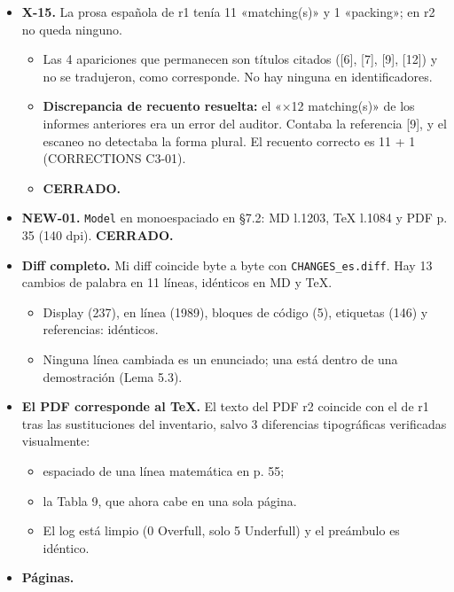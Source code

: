\documentclass[
]{article}
\providecommand{\tightlist}{%
  \setlength{\itemsep}{0pt}\setlength{\parskip}{0pt}}
\begin{document}
\begin{itemize}
\tightlist
\item
  \textbf{X-15.} La prosa española de r1 tenía 11 «matching(s)» y 1
  «packing»; en r2 no queda ninguno.

  \begin{itemize}
  \tightlist
  \item
    Las 4 apariciones que permanecen son títulos citados ({[}6{]},
    {[}7{]}, {[}9{]}, {[}12{]}) y no se tradujeron, como corresponde. No
    hay ninguna en identificadores.
  \item
    \textbf{Discrepancia de recuento resuelta:} el «×12 matching(s)» de
    los informes anteriores era un error del auditor. Contaba la
    referencia {[}9{]}, y el escaneo no detectaba la forma plural. El
    recuento correcto es 11 + 1 (CORRECTIONS C3-01).
  \item
    \textbf{CERRADO.}
  \end{itemize}
\item
  \textbf{NEW-01.} \texttt{Model} en monoespaciado en §7.2: MD l.1203,
  TeX l.1084 y PDF p. 35 (140 dpi). \textbf{CERRADO.}
\item
  \textbf{Diff completo.} Mi diff coincide byte a byte con
  \texttt{CHANGES\_es.diff}. Hay 13 cambios de palabra en 11 líneas,
  idénticos en MD y TeX.

  \begin{itemize}
  \tightlist
  \item
    Display (237), en línea (1989), bloques de código (5), etiquetas
    (146) y referencias: idénticos.
  \item
    Ninguna línea cambiada es un enunciado; una está dentro de una
    demostración (Lema 5.3).
  \end{itemize}
\item
  \textbf{El PDF corresponde al TeX.} El texto del PDF r2 coincide con
  el de r1 tras las sustituciones del inventario, salvo 3 diferencias
  tipográficas verificadas visualmente:

  \begin{itemize}
  \tightlist
  \item
    espaciado de una línea matemática en p. 55;
  \item
    la Tabla 9, que ahora cabe en una sola página.
  \item
    El log está limpio (0 Overfull, solo 5 Underfull) y el preámbulo es
    idéntico.
  \end{itemize}
\item
  \textbf{Páginas.}


\end{itemize}
\end{document}
